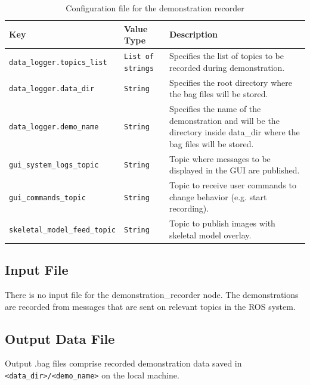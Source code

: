 \documentclass{CSSRforAfrica}
\begin{document}
\begin{longtable}[c]{|l|l|p{7cm}|}
    \caption{Configuration file for the demonstration recorder} \label{tab:config_file}\\
    \hline
    \rowcolor{gray!30}
    \small{\textbf{Key}} & \small{\textbf{Value Type}} & \small{\textbf{Description}} \\ \hline
    \endhead %
    
    \small{\texttt{data\_logger.topics\_list}} & \small{\texttt{List of strings}}  & \small{Specifies the list of topics to be recorded during demonstration.} \\ \hline
    \small{\texttt{data\_logger.data\_dir}} & \small{\texttt{String}} & \small{Specifies the root directory where the bag files will be stored.} \\ \hline
    \small{\texttt{data\_logger.demo\_name}} & \small{\texttt{String}} & \small{Specifies the name of the demonstration and will be the directory inside data\_dir where the bag files will be stored.} \\ \hline
    \small{\texttt{gui\_system\_logs\_topic}} & \small{\texttt{String}} & \small{Topic where messages to be displayed in the GUI are published.} \\ \hline
    \small{\texttt{gui\_commands\_topic}} & \small{\texttt{String}}& \small{Topic to receive user commands to change behavior (e.g. start recording).} \\ \hline
    \small{\texttt{skeletal\_model\_feed\_topic}} & \small{\texttt{String}} & \small{Topic to publish images with skeletal model overlay.} \\ \hline
\end{longtable}



\subsection*{Input File}
There is no input file for the demonstration\_recorder node. The demonstrations are recorded from messages that are sent on relevant topics in the ROS system. 


\subsection*{Output Data File}
Output .bag files comprise recorded demonstration data saved in \texttt{<data\_dir>/<demo\_name>} on the local machine. 
\end{document}
